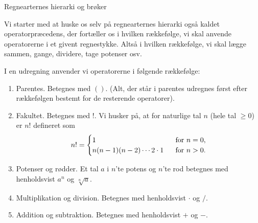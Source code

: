 \begin{center}
\Huge
Regnearternes hierarki og brøker
\end{center}

Vi starter med at huske os selv på regnearternes hierarki også kaldet operatorpræcedens, der fortæller os i hvilken rækkefølge, vi skal anvende operatorerne i et givent regnestykke. Altså i hvilken rækkefølge, vi skal lægge sammen, gange, dividere, tage potenser osv. 
\begin{defn}
I en udregning anvender vi operatorerne i følgende rækkefølge:
\begin{enumerate}[label=\roman*)]
\item Parentes. Betegnes med $()$. (Alt, der står i parentes udregnes først efter rækkefølgen bestemt for de resterende operatorer).
\item Fakultet. Betegnes med $!$. Vi husker på, at for naturlige tal $n$ (hele tal $\geq 0$) er $n!$ defineret som 
\begin{align*}
n! = \begin{cases}
1 \ &\textnormal{ for }n=0,\\
n(n-1)(n-2)\cdots 2\cdot 1 \ &\textnormal{ for }n>0.
\end{cases}
\end{align*}
\item Potenser og rødder. Et tal $a$ i $n$'te potens og $n$'te rod betegnes med henholdsvist $a^n$ og $\sqrt[n]{a}$.
\item Multiplikation og division. Betegnes med henholdsvist $\cdot$ og $/$.
\item Addition og subtraktion. Betegnes med henholdsvist $+$ og $-$.
\end{enumerate}
\end{defn} 
